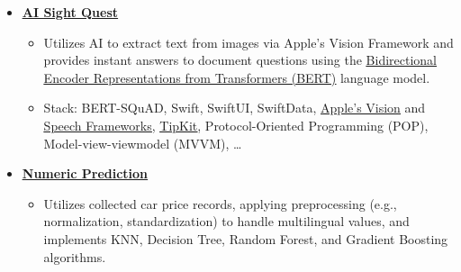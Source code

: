 \documentclass[letter,10pt]{article}
\newcommand{\customsquare}{\raisebox{0.25ex}{\scalebox{0.45}{$\blacksquare$}}}
\begin{document}
\begin{itemize}[label={\customsquare}]
    \item \href{https://github.com/karami-mehdi/AISightQuest}{\underline{\textbf{AI Sight Quest}}}
    \begin{itemize}
        \item Utilizes AI to extract text from images via Apple's Vision Framework and provides instant answers to document questions using the \href{https://arxiv.org/abs/1810.04805}{\underline{Bidirectional Encoder Representations from Transformers (BERT)}} language model.
        \item Stack: BERT-SQuAD, Swift, SwiftUI, SwiftData, \href{https://developer.apple.com/documentation/vision}{\underline{Apple's Vision}} and \href{https://developer.apple.com/documentation/speech}{\underline{Speech Frameworks}}, \href{https://developer.apple.com/documentation/tipkit}{\underline{TipKit}}, Protocol-Oriented Programming (POP), Model-view-viewmodel (MVVM), …
    \end{itemize}
    \newpage
    \item \href{https://github.com/karami-mehdi/TodayILearned/tree/main/DataMining}{\underline{\textbf{Numeric Prediction}}}
    \begin{itemize}
        \item Utilizes collected car price records, applying preprocessing (e.g., normalization, standardization) to handle multilingual values, and implements KNN, Decision Tree, Random Forest, and Gradient Boosting algorithms.
    \end{itemize}




\end{itemize}
\end{document}
